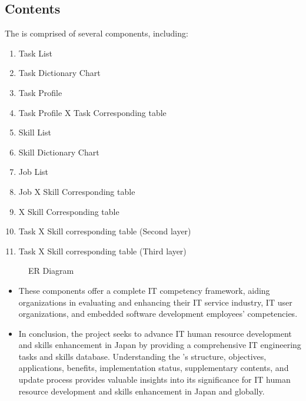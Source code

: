 \subsection{ Contents}
The  is comprised of several components, including:

\begin{enumerate}
    \item Task List
    \item Task Dictionary Chart
    \item Task Profile
    \item Task Profile X Task Corresponding table
    \item Skill List
    \item Skill Dictionary Chart
    \item Job List
    \item Job X Skill Corresponding table
    \item {} X Skill Corresponding table
    \item Task X Skill corresponding table (Second layer)
    \item Task X Skill corresponding table (Third layer)
\end{enumerate}

\begin{figure}[H]
    \centering
    \caption{  ER Diagram }
    \label{fig:iCD_ER_Diagram}
\end{figure}

\begin{itemize}
    \renewcommand\labelitemi{-}
    \item These components offer a complete IT competency framework, aiding organizations in evaluating and enhancing their IT service industry, IT user organizations, and embedded software development employees' competencies.
    \item In conclusion, the  project seeks to advance IT human resource development and skills enhancement in Japan by providing a comprehensive IT engineering tasks and skills database. Understanding the 's structure, objectives, applications, benefits, implementation status, supplementary contents, and update process provides valuable insights into its significance for IT human resource development and skills enhancement in Japan and globally.
\end{itemize}

